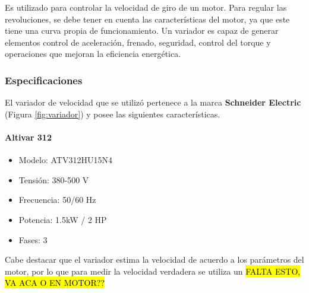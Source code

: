 \begin{tcolorbox}[colback=blue!5!white,colframe=blue!75!black,title=Variador de velocidad]
	Es utilizado para controlar la velocidad de giro de un motor.
	Para regular las revoluciones, se debe tener en cuenta las características del motor, ya que este tiene una curva propia de funcionamiento. Un variador es capaz de generar elementos control de aceleración, frenado, seguridad, control del torque y operaciones que mejoran la eficiencia energética.
\end{tcolorbox}

\subsubsection{Especificaciones}
El variador de velocidad que se utilizó pertenece a la marca \textbf{Schneider Electric} (Figura \ref{fig:variador}) y posee las siguientes características.
\paragraph*{Altivar 312}
\begin{minipage}[t]{.5\textwidth}
	\begin{itemize}
		\item 	Modelo: ATV312HU15N4
		\item   Tensión: 380-500 V
		\item 	Frecuencia: 50/60 Hz
		\item 	Potencia: 1.5kW / 2 HP
		\item 	Fases: 3
	\end{itemize}
\end{minipage}
\begin{minipage}[t]{.5\textwidth}
	\centering{}
	\label{fig:variador}
\end{minipage}


Cabe destacar que el variador estima la velocidad de acuerdo a los parámetros del motor, por lo que para medir la velocidad verdadera se utiliza un \hl{FALTA ESTO, VA ACA O EN MOTOR??}


